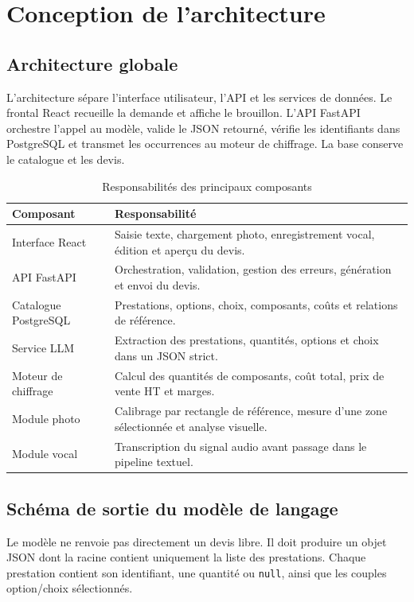 \section{Conception de l'architecture}
\subsection{Architecture globale}
L'architecture sépare l'interface utilisateur, l'API et les services de données. Le frontal React recueille la demande et affiche le brouillon. L'API FastAPI orchestre l'appel au modèle, valide le JSON retourné, vérifie les identifiants dans PostgreSQL et transmet les occurrences au moteur de chiffrage. La base conserve le catalogue et les devis.

\begin{table}[H]
\centering
\caption{Responsabilités des principaux composants}
\begin{tabular}{p{}p{}}
\toprule
\textbf{Composant} & \textbf{Responsabilité} \\
\midrule
Interface React & Saisie texte, chargement photo, enregistrement vocal, édition et aperçu du devis. \\
API FastAPI & Orchestration, validation, gestion des erreurs, génération et envoi du devis. \\
Catalogue PostgreSQL & Prestations, options, choix, composants, coûts et relations de référence. \\
Service LLM & Extraction des prestations, quantités, options et choix dans un JSON strict. \\
Moteur de chiffrage & Calcul des quantités de composants, coût total, prix de vente HT et marges. \\
Module photo & Calibrage par rectangle de référence, mesure d'une zone sélectionnée et analyse visuelle. \\
Module vocal & Transcription du signal audio avant passage dans le pipeline textuel. \\
\bottomrule
\end{tabular}
\end{table}

\subsection{Schéma de sortie du modèle de langage}
Le modèle ne renvoie pas directement un devis libre. Il doit produire un objet JSON dont la racine contient uniquement la liste des prestations. Chaque prestation contient son identifiant, une quantité ou \texttt{null}, ainsi que les couples option/choix sélectionnés.

